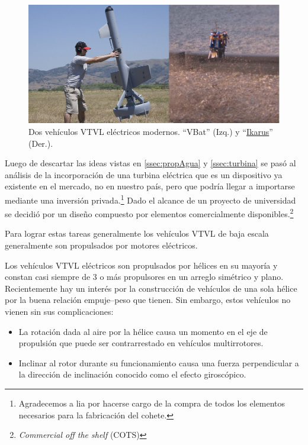 \begin{figure}[htb]
    \centering
    \includegraphics[width=0.8\linewidth]{fig/vbat_icarus.png}
    \caption{Dos vehículos VTVL eléctricos modernos. ``VBat'' (Izq.) y ``\href{https://hackaday.com/2018/08/31/single-rotor-drone-a-thrust-vectoring-monocopter/}{Ikarus}'' (Der.).}
    \label{fig:vbat_icarus}
\end{figure}

Luego de descartar las ideas vistas en \ref{ssec:propAgua} y \ref{ssec:turbina} se pasó al análisis de la incorporación de una turbina eléctrica que es un dispositivo ya existente en el mercado, no en nuestro país, pero que podría llegar a importarse mediante una
inversión privada.\footnote{Agradecemos a \gls{lia} por hacerse cargo de la compra de todos los elementos necesarios para la fabricación del cohete.} Dado el alcance de un proyecto de universidad se decidió por un diseño compuesto por elementos comercialmente disponibles.\footnote{\textit{Commercial off the shelf} (COTS)}


\medskip


Para lograr estas tareas generalmente los vehículos VTVL de baja escala generalmente son propulsados por motores eléctricos.

\medskip

Los vehículos VTVL eléctricos son propulsados por hélices en su mayoría y constan casi siempre de 3 o más propulsores en un arreglo simétrico y plano. Recientemente hay un interés por la construcción de vehículos de una sola hélice por la buena relación empuje--peso que tienen. Sin embargo, estos vehículos no vienen sin sus complicaciones: 

\begin{itemize}
    \item La rotación dada al aire por la hélice causa un momento en el eje de propulsión que puede ser contrarrestado en vehículos multirrotores.
    \item Inclinar al rotor durante su funcionamiento causa una fuerza perpendicular a la dirección de inclinación conocido como el efecto giroscópico. 
\end{itemize}

